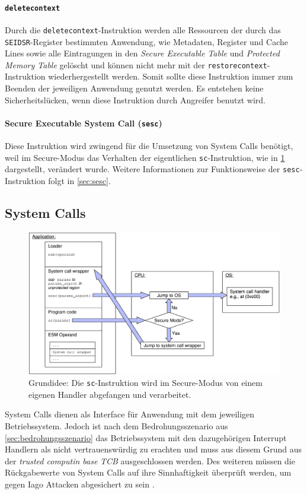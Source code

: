 \documentclass[ngerman]{sig-alternate-05-2015}
\begin{document}
\paragraph{\texttt{deletecontext}}
Durch die \texttt{deletecontext}-Instruktion werden alle Ressourcen der durch das \texttt{SEIDSR}-Register bestimmten Anwendung, wie Metadaten, Register und Cache Lines sowie alle Eintragungen in den \emph{Secure Executable Table} und \emph{Protected Memory Table} gelöscht und können nicht mehr mit der \texttt{restorecontext}-Instruktion wiederhergestellt werden. Somit sollte diese Instruktion immer zum Beenden der jeweiligen Anwendung genutzt werden. Es entstehen keine Sicherheitslücken, wenn diese Instruktion durch Angreifer benutzt wird. 

\paragraph{Secure Executable System Call (\texttt{sesc})}
Diese Instruktion wird zwingend für die Umsetzung von System Calls benötigt, weil im Secure-Modus das Verhalten der eigentlichen \texttt{sc}-Instruktion, wie in \cref{fig:sesc} dargestellt, verändert wurde. Weitere Informationen zur Funktionsweise der \texttt{sesc}-Instruktion folgt in \cref{sec:sesc}.

\subsection{System Calls}
\begin{figure}
	\centering
	\includegraphics[width=\columnwidth]{sesc2}
	\caption{Grundidee: Die \texttt{sc}-Instruktion wird im Secure-Modus von einem eigenen Handler abgefangen und verarbeitet. \cite{boivie2013secureblue++:big}}
	\label{fig:sesc}
\end{figure}
\label{sec:sesc}
System Calls dienen als Interface für Anwendung mit dem jeweiligen Betriebssystem. Jedoch ist nach dem Bedrohungsszenario aus \cref{sec:bedrohungsszenario} das Betriebssystem mit den dazugehörigen Interrupt Handlern als nicht vertrauenswürdig zu erachten und muss aus diesem Grund aus der \emph{trusted computin base} \emph{TCB} ausgeschlossen werden. Des weiteren müssen die Rückgabewerte von System Calls auf ihre Sinnhaftigkeit überprüft werden, um gegen Iago Attacken abgesichert zu sein \cite{checkoway2013iago}.
\end{document}
